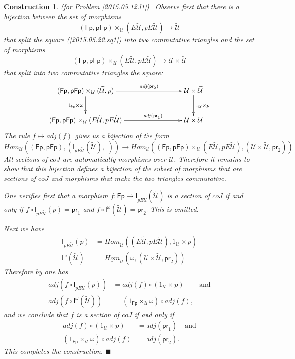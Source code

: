 \documentclass[12pt]{article}
\numberwithin{equation}{section}
\newtheorem{construction0}[proposition]{Construction}
\newenvironment{construction}[1]{\begin{construction0}(for Problem \ref{#1})\ }{$\blacksquare$ \end{construction0}}
\newcommand{\sr}{\rightarrow}
\newcommand{\uu}{\underline}
\newcommand{\iHom}{\uu{Hom}}
\newcommand{\wt}{\widetilde}
\newcommand{\id}{1}            %
\newcommand{\U}{\mathcal{U}}
\newcommand{\I}{\mathsf{I}}
\newcommand{\Fp}{\mathsf{Fp}}
\newcommand{\pFp}{\mathsf{pFp}}
\newcommand{\pr}{\mathsf{pr}}
\begin{document}
%
\begin{construction}{2015.05.12.l1}\rm
\label{2015.05.22.constr1} Observe first that there is a bijection between the
set of morphisms
%
$$(\Fp,\pFp)\times_\U(E\wt{\U},pE\wt{\U})\sr \wt{\U}$$
%
that split the square (\ref{2015.05.22.sq1}) into two commutative triangles and
the set of morphisms
%
$$(\Fp,\pFp)\times_\U(E\wt{\U},pE\wt{\U})\sr \U\times\wt{\U}$$
%
that split into two commutative triangles the square:
%
$$
\begin{xy}
          \xymatrix@C=7pc{ (\Fp,\pFp)\times_\U(\wt{\U},p) \ar[r]^-{adj(\pr_2)}
            \ar[d]_{\id_{\Fp}\times \omega} & \U\times \wt{\U} \ar[d]^{\id_\U\times
              p}\\ (\Fp,\pFp)\times_\U(E\wt{\U},pE\wt{\U}) \ar[r]^-{adj(\pr_1)} &
            \U\times \U }
\end{xy}
$$
%
The rule $f\mapsto adj(f)$ gives us a bijection of the form
%
$$Hom_\U((\Fp,\pFp),(\I_{pE\wt{\U}}(\wt{\U}),\_))\sr Hom_\U((\Fp,\pFp)\times_\U
(E\wt{\U},pE\wt{\U}), (\U\times\wt{\U}, \pr_2))$$
%
All sections of $coJ$ are automatically morphisms over $\U$. Therefore it
remains to show that this bijection defines a bijection of the subset of
morphisms that are sections of $coJ$ and morphisms that make the two triangles
commutative.

One verifies first that a morphism $f:\Fp\sr \I_{pE\wt{\U}}(\wt{\U})$ is a section
of $coJ$ if and only if $f\circ \I_{pE\wt{\U}}(p)=\pr_1$ and $f\circ
\I^{\omega}(\wt{\U})=\pr_2$. This is omitted.

Next we have
%
\begin{align*}
  \I_{pE\wt{\U}}(p)&=\iHom_\U((E\wt{\U},pE\wt{\U}),\id_\U\times p) \\
  \I^{\omega}(\wt{\U})&=\iHom_\U(\omega,(\U\times\wt{\U},\pr_2))
\end{align*}
%
Therefore by \cite[Lemma 4.1.7]{presheavesOb} one has
%
\begin{align*}
  adj(f\circ \I_{pE\wt{\U}}(p))&=adj(f)\circ (\id_\U\times p) & \text{and} \\
  adj(f\circ \I^{\omega}(\wt{\U}))&=(\id_{\Fp}\times_{\U}\omega)\circ adj(f),
\end{align*}
%
and we conclude that $f$ is a section of $coJ$ if and only if
%
\begin{align*}
  adj(f)\circ (\id_\U\times p)&=adj(\pr_1) & \text{and} \\
  (\id_{\Fp}\times_{\U}\omega)\circ adj(f)&=adj(\pr_2).
\end{align*}
% 
This completes the construction.
\end{construction}
\end{document}
